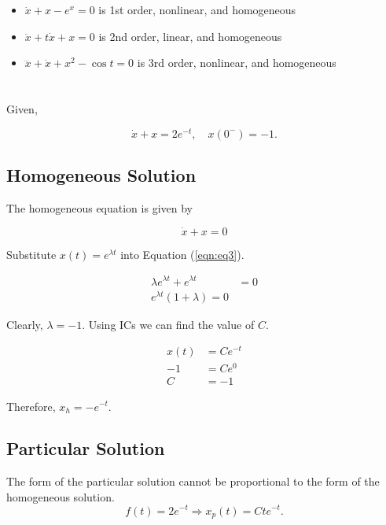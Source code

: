 \documentclass[12pt]{article}
\numberwithin{equation}{section}
\begin{document}
  \section{}

  \begin{itemize}
    \item $\dot x + x -e^x = 0$ is 1st order, nonlinear, and homogeneous
    \item $\ddot x + t\dot x + x = 0$ is 2nd order, linear, and homogeneous
    \item $\dddot x + \dot x + x ^2 - \cos t = 0$ is 3rd order, nonlinear, and homogeneous
  \end{itemize}

  \newpage

  \section{}

  Given,

  \[
      \dot x + x = 2 e^{-t}, \quad x(0^{-}) = -1
    .\]

  \subsection{Homogeneous Solution}

  The homogeneous equation is given by

  \begin{equation} \label{eqn:eq3}
    \dot x + x = 0
  \end{equation}

  Substitute $ x(t) = e^{\lambda t} $ into Equation (\ref{eqn:eq3}).

  \begin{align}
    \lambda e^{\lambda t} + e^{\lambda t} &= 0 \\
    e^{\lambda t} (1 + \lambda) = 0
  \end{align}

  Clearly, $ \lambda = -1. $ Using ICs we can find the value of $ C. $

  \begin{align}
    x(t) &= Ce^{-t} \\
    -1 &= Ce^0 \\
    C &= -1
  \end{align}

  Therefore, $ x_h = -e^{-t}. $

  \newpage

  \subsection{Particular Solution}
  The form of the particular solution cannot be proportional to the form of the homogeneous solution.
  \[
      f(t) = 2e^{-t} \Rightarrow x_p(t) = Cte^{-t}
    .\]
\end{document}
